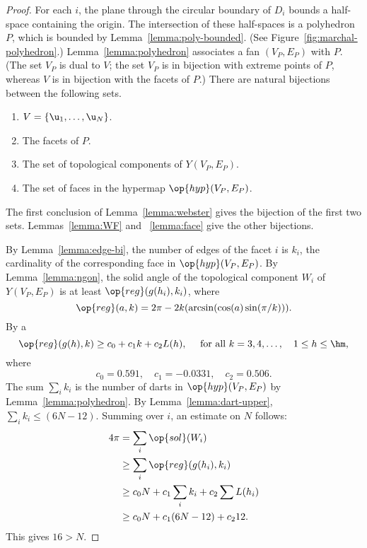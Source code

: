 \begin{cnl}
\begin{proof}
%
For each $i$, the plane through the circular boundary of $D_i$ bounds
a half-space containing the origin.  The intersection of these
half-spaces is a polyhedron $P$, which is bounded by
Lemma~\ref{lemma:poly-bounded}.  (See Figure~\ref{fig:marchal-polyhedron}.)
Lemma~\ref{lemma:polyhedron}
associates a fan $(V_P,E_P)$ with $P$.  (The set $V_P$ is dual to $
V$; the set $V_P$ is in bijection with extreme points of $P$, whereas
$ V$ is in bijection with the facets of $P$.)  There are natural
bijections between the following sets.
\begin{enumerate}\wasitemize  
\item $ V = \setenumdots{\u}{1}{N}$.
\item The  facets of $P$.
\item The set of  topological components of $Y(V_P,E_P)$.
\item The set of faces in the hypermap $\op{hyp}(V_P,E_P)$.
\end{enumerate}\wasitemize 
The first conclusion
of Lemma~\ref{lemma:webster} gives 
the bijection of the first two sets.  Lemmas~\ref{lemma:WF} and
~\ref{lemma:face} give the other bijections.

\figZXEVDCA %

By Lemma~\ref{lemma:edge-bi}, the number of edges of the facet $i$
is $k_i$, the cardinality of the corresponding face in $\op{hyp}(V_P,E_P)$.   
By Lemma~\ref{lemma:ngon}, the solid
angle of the topological component $W_i$ of $Y(V_P,E_P)$ is at least
$\op{reg}(g(h_i),k_i)$, where %
%
%
\[  
\op{reg}(a,k) = 2\pi - 2 k (\arcsin(\cos(a)\sin(\pi/k))).
\] 
By a  
\begin{equation}\label{eqn:alin} 
\op{reg}(g(h),k) \ge c_0 + c_1 k + c_2 L(h),\quad \text{ for all }
k = 3,4,\ldots,\quad 1\le h\le \hm,
\end{equation}
where
\[ 
c_0=0.591,\quad c_1=-0.0331,\quad c_2 = 0.506.
\] The sum $\sum_i k_i$ is the number of darts in $\op{hyp}(V_P,E_P)$
by Lemma~\ref{lemma:polyhedron}.  By Lemma~\ref{lemma:dart-upper},
$\sum_i k_i \le (6N-12)$.  Summing over $i$, an estimate on $N$
follows: %
%
\begin{align*} 
4\pi &= \sum_i\op{sol}(W_i)\\
&\ge \sum_i \op{reg}(g(h_i),k_i) \\
&\ge c_0 N +c_1\sum_i k_i + c_2 \sum L(h_i)\\
&\ge c_0 N +c_1 (6N-12) + c_2 12.
\end{align*}
This gives
$16 > N$.
\end{proof} 



\end{cnl}
